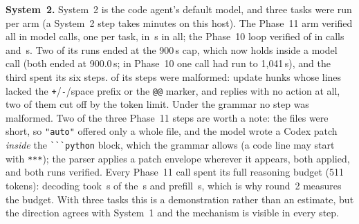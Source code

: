 \textbf{System~2.} System~2 is the code agent's default model, and three tasks
were run per arm (a System~2 step takes minutes on this host). The Phase~11 arm
verified all \HABTwoNewVerified{} in \HABTwoNewCalls{} model calls, one per task,
in \HABTwoNewWall\,s in all; the Phase~10 loop verified
\HABTwoOldVerified{} of \HABTwoOldN{} in \HABTwoOldCalls{} calls and
\HABTwoOldWall\,s. Two of its runs ended at the 900\,s cap, which now holds
inside a model call (both ended at 900.0\,s; in Phase~10 one call had run to
1{,}041\,s), and the third spent its six steps. \HABTwoOldMalformed{} of its
\HABTwoOldActions{} steps were malformed: update hunks whose lines lacked the
\texttt{+}/\texttt{-}/space prefix or the \texttt{@@} marker, and replies with no
action at all, two of them cut off by the token limit. Under the grammar no step
was malformed. Two of the three Phase~11 steps are worth a note: the files were
short, so \texttt{"auto"} offered only a whole file, and the model wrote a Codex
patch \emph{inside} the \verb|```python| block, which the grammar allows (a code
line may start with \texttt{***}); the parser applies a patch envelope wherever it
appears, both applied, and both runs verified. Every Phase~11 call spent its full
reasoning budget (511 tokens): decoding took \HABTwoNewDecodeS\,s of the
\HABTwoNewWall\,s and prefill \HABTwoNewPrefillS\,s, which is why round~2
measures the budget. With three tasks this is a demonstration rather than an
estimate, but the direction agrees with System~1 and the mechanism is visible in
every step.


